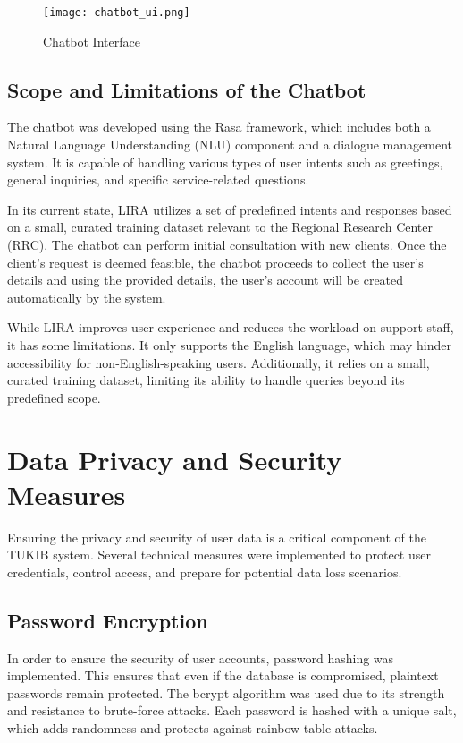 \begin{figure}[h]
	\centering
	\texttt{[image: chatbot\_ui.png]}
	\caption{Chatbot Interface}
	\label{fig:chatbot_ui}
\end{figure}

\subsection{Scope and Limitations of the Chatbot}

The chatbot was developed using the Rasa framework, which includes both a Natural Language Understanding (NLU) component and a dialogue management system. It is capable of handling various types of user intents such as greetings, general inquiries, and specific service-related questions.

In its current state, LIRA utilizes a set of predefined intents and responses based on a small, curated training dataset relevant to the Regional Research Center (RRC). The chatbot can perform initial consultation with new clients. Once the client's request is deemed feasible, the chatbot proceeds to collect the user’s details and using the provided details, the user's account will be created automatically by the system.

While LIRA improves user experience and reduces the workload on support staff, it has some limitations. It only supports the English language, which may hinder accessibility for non-English-speaking users. Additionally, it relies on a small, curated training dataset, limiting its ability to handle queries beyond its predefined scope.

\section{Data Privacy and Security Measures}

Ensuring the privacy and security of user data is a critical component of the TUKIB system. Several technical measures were implemented to protect user credentials, control access, and prepare for potential data loss scenarios.

\subsection{Password Encryption}

In order to ensure the security of user accounts, password hashing was implemented. This ensures that even if the database is compromised, plaintext passwords remain protected. The bcrypt algorithm was used due to its strength and resistance to brute-force attacks. Each password is hashed with a unique salt, which adds randomness and protects against rainbow table attacks.

